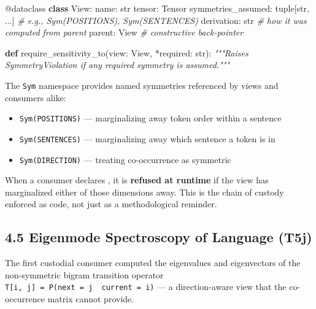 \documentclass[
  twocolumn,
  10pt,
  a4paper]{article}
\newenvironment{Shaded}{}{}
\newcommand{\AttributeTok}[1]{\textcolor[rgb]{0.49,0.56,0.16}{#1}}
\newcommand{\BuiltInTok}[1]{\textcolor[rgb]{0.00,0.50,0.00}{#1}}
\newcommand{\CommentTok}[1]{\textcolor[rgb]{0.38,0.63,0.69}{\textit{#1}}}
\newcommand{\KeywordTok}[1]{\textcolor[rgb]{0.00,0.44,0.13}{\textbf{#1}}}
\newcommand{\NormalTok}[1]{#1}
\newcommand{\OperatorTok}[1]{\textcolor[rgb]{0.40,0.40,0.40}{#1}}
\providecommand{\tightlist}{%
  \setlength{\itemsep}{0pt}\setlength{\parskip}{0pt}}
\begin{document}
\begin{Shaded}
\begin{Highlighting}[]
\AttributeTok{@dataclass}
\KeywordTok{class}\NormalTok{ View:}
\NormalTok{    name: }\BuiltInTok{str}
\NormalTok{    tensor: Tensor}
\NormalTok{    symmetries\_assumed: }\BuiltInTok{tuple}\NormalTok{[}\BuiltInTok{str}\NormalTok{, ...]  }\CommentTok{\# e.g., Sym(POSITIONS), Sym(SENTENCES)}
\NormalTok{    derivation: }\BuiltInTok{str}                      \CommentTok{\# how it was computed from parent}
\NormalTok{    parent: View                         }\CommentTok{\# constructive back{-}pointer}

\KeywordTok{def}\NormalTok{ require\_sensitivity\_to(view: View, }\OperatorTok{*}\NormalTok{required: }\BuiltInTok{str}\NormalTok{):}
    \CommentTok{"""Raises SymmetryViolation if any required symmetry is assumed."""}
\end{Highlighting}
\end{Shaded}

The \texttt{Sym} namespace provides named symmetries referenced by views
and consumers alike:

\begin{itemize}
\tightlist
\item
  \texttt{Sym(POSITIONS)} --- marginalizing away token order within a
  sentence
\item
  \texttt{Sym(SENTENCES)} --- marginalizing away which sentence a token
  is in
\item
  \texttt{Sym(DIRECTION)} --- treating co-occurrence as symmetric
\end{itemize}

When a consumer declares
\texttt{},
it is \textbf{refused at runtime} if the view has marginalized either of
those dimensions away. This is the chain of custody enforced as code,
not just as a methodological reminder.

\hypertarget{eigenmode-spectroscopy-of-language-t5j}{%
\subsection{4.5 Eigenmode Spectroscopy of Language
(T5j)}\label{eigenmode-spectroscopy-of-language-t5j}}

The first custodial consumer computed the eigenvalues and eigenvectors
of the non-symmetric bigram transition operator
\texttt{T{[}i,\ j{]}\ =\ P(next\ =\ j\ \textbar{}\ current\ =\ i)} --- a
direction-aware view that the co-occurrence matrix cannot provide.
\end{document}
